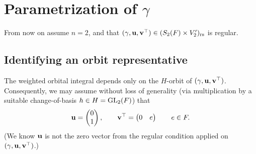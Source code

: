 \section{Parametrization of $\gamma$}
From now on assume $n = 2$,
and that $(\gamma, \mathbf u, \mathbf v^\top) \in (S_2(F) \times V'_2)_{\mathrm{rs}}$ is regular.

\subsection{Identifying an orbit representative}
The weighted orbital integral depends only on the $H$-orbit of $(\gamma, \mathbf u, \mathbf v^\top)$.
Consequently, we may assume without loss of generality
(via multiplication by a suitable change-of-basis $h \in H = \operatorname{GL}_2(F)$) that
\[ \mathbf u = \begin{pmatrix} 0 \\ 1 \end{pmatrix}, \qquad
  \mathbf v^\top = \begin{pmatrix} 0 & e \end{pmatrix} \qquad e \in F. \]
(We know $\mathbf u$ is not the zero vector from the regular condition
applied on $(\gamma, \mathbf u, \mathbf v^\top)$.)

